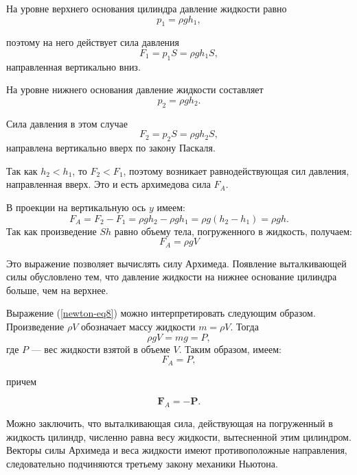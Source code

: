 \documentclass[All.tex]{subfiles}
\begin{document}
На уровне верхнего основания цилиндра давление жидкости равно $$ p_{1} = \rho gh_{1}, $$

поэтому на него действует сила давления $$ F_{1} = p_{1}S = \rho gh_{1}S, $$
направленная вертикально вниз.

На уровне нижнего основания давление жидкости составляет $$p_{2} = \rho gh_{2}.$$

Сила давления в этом случае $$ F_{2} = p_{2}S = \rho gh_{2}S, $$ 
направлена вертикально вверх по закону Паскаля.

Так как $ h_{2} < h_{1} $, то $ F_{2} < F_{1} $, поэтому возникает равнодействующая сил давления, направленная вверх. 
Это и есть архимедова сила $ F_{A} $. 

В проекции на вертикальную ось $ y $ имеем:
\begin{equation}\label{newton-eq7}
F_{A} = F_{2} - F_{1} = \rho gh_{2} - \rho gh_{1} = \rho g(h_{2} - h_{1}) = \rho gh.
\end{equation} 
Так как произведение $ Sh $ равно объему тела, погруженного в жидкость, получаем: 
\begin{equation}\label{newton-eq8}
F_{A} = \rho gV
\end{equation} 

Это выражение позволяет вычислять силу Архимеда.
Появление выталкивающей силы обусловлено тем, что давление жидкости на нижнее основание цилиндра больше, чем на верхнее.

Выражение (\ref{newton-eq8}) можно интерпретировать следующим образом. 
Произведение $ \rho V $ обозначает массу жидкости  $ m = \rho V $. 
Тогда $$\rho g V = mg = P,$$
где $ P $ — вес жидкости взятой в объеме $ V $. 
Таким образом, имеем:
\begin{equation}\label{newton-eq9}
F_{A} = P,
\end{equation} 

причем 

\begin{equation}\label{newton-eq10}
\textbf{F}_{A} = -\textbf{P}.
\end{equation} 

Можно заключить, что выталкивающая сила, действующая на погруженный в жидкость цилиндр, численно равна весу жидкости, вытесненной этим цилиндром.
Векторы силы Архимеда и веса жидкости имеют противоположные направления, следовательно подчиняются третьему закону механики Ньютона.
\end{document}

